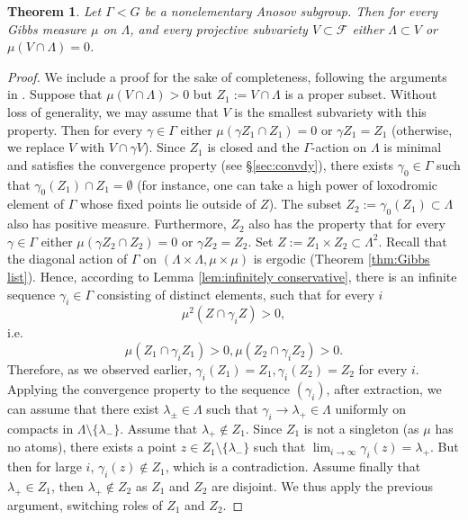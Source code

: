 \documentclass[12pt]{amsbook}%
\newtheorem{thm}{Theorem}[chapter]
\theoremstyle{definition}
\theoremstyle{remark}
\numberwithin{section}{chapter}
\numberwithin{subsection}{section}
\numberwithin{figure}{chapter}
\def\cF{{\mathscr{F}}}
\def\Ga{\Gamma}
\def\ga{\gamma}
\def\La{\Lambda}
\def\la{\lambda}
\begin{document}
{{\begin{thm}\label{thm:kim-oh}
Let $\Ga< G$ be a nonelementary Anosov subgroup. Then for every Gibbs measure $\mu$ on $\La$, and every projective subvariety  $V\subset \cF$ 
either $\La\subset V$ or $\mu(V\cap \La)=0$.  
\end{thm}
\begin{proof} We include a proof for the sake of completeness, following the arguments in  \cite{Kim-Oh}. Suppose that  $\mu(V\cap \La)>0$ but 
$Z_1:=V\cap \La$ is a proper subset. Without loss of generality, we may assume that $V$ is the smallest subvariety with this property. 
Then for every $\ga\in \Ga$ either $\mu(\ga Z_1\cap Z_1)=0$ or $\ga Z_1=Z_1$ (otherwise, we replace $V$ with $V\cap \ga V$). Since $Z_1$ is closed and the $\Ga$-action on $\La$ is minimal and satisfies the convergence property (see \S \ref{sec:convdy}), there exists $\ga_0\in \Ga$ such that $\ga_0(Z_1)\cap Z_1=\emptyset$ (for instance, one can take a high power of loxodromic element of $\Ga$ whose fixed points lie outside of $Z$). 
The subset $Z_2:=\ga_0(Z_1)\subset \La$ also has positive measure. Furthermore, $Z_2$ also has the property that for every $\ga\in \Ga$  either $\mu(\ga Z_2\cap Z_2)=0$ or $\ga Z_2=Z_2$. Set $Z:= Z_1\times Z_2\subset \La^2$. Recall that  the diagonal action of $\Ga$ on $(\La\times \La, \mu\times \mu)$ is ergodic (Theorem \ref{thm:Gibbs list}). Hence, according to Lemma \ref{lem:infinitely conservative},  there is an infinite sequence $\gamma_i\in \Ga$ consisting of 
distinct elements, such that for every $i$
$$
 \mu^2(Z\cap \ga_i Z)>0,
$$
i.e.
$$
\mu(Z_1\cap \ga_i Z_1)>0, \mu(Z_2\cap \ga_i Z_2)>0.  
$$
Therefore, as we observed earlier, $\ga_i(Z_1)=Z_1, \ga_i(Z_2)=Z_2$ for every $i$. Applying the convergence property to the sequence $(\ga_i)$, after extraction, we can assume that there exist $\la_\pm\in \La$ such that $\ga_i\to \la_+\in \La$ uniformly on compacts in $\La\setminus \{\la_-\}$. Assume that $\la_+\notin Z_1$.  
Since $Z_1$ is not a singleton (as $\mu$ has no atoms), there exists a point $z\in Z_1\setminus \{\la_-\}$ such that $\lim_{i\to\infty} \ga_i(z)=\la_+$. But then for large $i$, $\ga_i(z)\notin Z_1$,  which is a contradiction. 
Assume finally that $\la_+ 
\in Z_1$, then $\la_+ 
\notin Z_2$ as $Z_1$ and $Z_2$ are disjoint. We thus apply the previous argument, 
switching roles of $Z_1$ and $Z_2$. 
\end{proof}


}}
\end{document}
